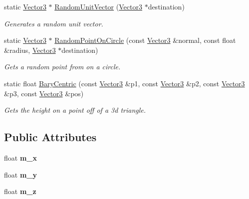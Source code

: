 \begin{DoxyCompactItemize}
static \hyperlink{class_flounder_1_1_vector3}{Vector3} $\ast$ \hyperlink{class_flounder_1_1_vector3_a9c70a1563db0bef798e154d2aa7e4480}{Random\+Unit\+Vector} (\hyperlink{class_flounder_1_1_vector3}{Vector3} $\ast$destination)
\begin{DoxyCompactList}\small\item\em Generates a random unit vector. \end{DoxyCompactList}\item 
static \hyperlink{class_flounder_1_1_vector3}{Vector3} $\ast$ \hyperlink{class_flounder_1_1_vector3_a19d9e06bd594d1c6244c232e8d8a93c2}{Random\+Point\+On\+Circle} (const \hyperlink{class_flounder_1_1_vector3}{Vector3} \&normal, const float \&radius, \hyperlink{class_flounder_1_1_vector3}{Vector3} $\ast$destination)
\begin{DoxyCompactList}\small\item\em Gets a random point from on a circle. \end{DoxyCompactList}\item 
static float \hyperlink{class_flounder_1_1_vector3_a889453e1994d0cf3ac129ffbf3fdbb6d}{Bary\+Centric} (const \hyperlink{class_flounder_1_1_vector3}{Vector3} \&p1, const \hyperlink{class_flounder_1_1_vector3}{Vector3} \&p2, const \hyperlink{class_flounder_1_1_vector3}{Vector3} \&p3, const \hyperlink{class_flounder_1_1_vector3}{Vector3} \&pos)
\begin{DoxyCompactList}\small\item\em Gets the height on a point off of a 3d triangle. \end{DoxyCompactList}\end{DoxyCompactItemize}
\subsection*{Public Attributes}
\begin{DoxyCompactItemize}
\item 
\mbox{\label{class_flounder_1_1_vector3_ab946f0b62ea58acf7afb587580e495ca}} 
float {\bfseries m\+\_\+x}
\item 
\mbox{\label{class_flounder_1_1_vector3_ade3bb862ea5acdffb26bdc03d7fc117e}} 
float {\bfseries m\+\_\+y}
\item 
\mbox{\label{class_flounder_1_1_vector3_a246d3c1ad7e4159ce73c6d85e1743af8}} 
float {\bfseries m\+\_\+z}
\end{DoxyCompactItemize}


